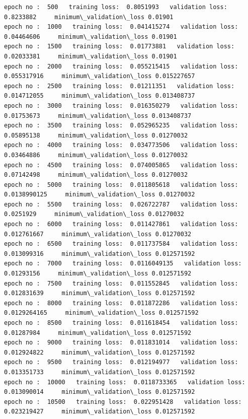 \documentclass[11pt, a4paper , landscape]{article}
\begin{document}
    \begin{Verbatim}[commandchars=\\\{\}]
epoch no :  500   training loss:  0.8051993   validation loss:  0.8233882     minimum\_validation\_loss 0.01901
epoch no :  1000   training loss:  0.041415274   validation loss:  0.04464606     minimum\_validation\_loss 0.01901
epoch no :  1500   training loss:  0.01773881   validation loss:  0.02033381     minimum\_validation\_loss 0.01901
epoch no :  2000   training loss:  0.055215415   validation loss:  0.055317916     minimum\_validation\_loss 0.015227657
epoch no :  2500   training loss:  0.01211351   validation loss:  0.014712055     minimum\_validation\_loss 0.013408737
epoch no :  3000   training loss:  0.016350279   validation loss:  0.01753673     minimum\_validation\_loss 0.013408737
epoch no :  3500   training loss:  0.052965235   validation loss:  0.05895138     minimum\_validation\_loss 0.01270032
epoch no :  4000   training loss:  0.034773506   validation loss:  0.03464886     minimum\_validation\_loss 0.01270032
epoch no :  4500   training loss:  0.074005865   validation loss:  0.07142498     minimum\_validation\_loss 0.01270032
epoch no :  5000   training loss:  0.011805618   validation loss:  0.0138990125     minimum\_validation\_loss 0.01270032
epoch no :  5500   training loss:  0.026722787   validation loss:  0.0251929     minimum\_validation\_loss 0.01270032
epoch no :  6000   training loss:  0.011427861   validation loss:  0.012761667     minimum\_validation\_loss 0.01270032
epoch no :  6500   training loss:  0.011737584   validation loss:  0.013099316     minimum\_validation\_loss 0.012571592
epoch no :  7000   training loss:  0.0116049135   validation loss:  0.01293156     minimum\_validation\_loss 0.012571592
epoch no :  7500   training loss:  0.011552845   validation loss:  0.012831639     minimum\_validation\_loss 0.012571592
epoch no :  8000   training loss:  0.011872286   validation loss:  0.0129264165     minimum\_validation\_loss 0.012571592
epoch no :  8500   training loss:  0.011618454   validation loss:  0.01287984     minimum\_validation\_loss 0.012571592
epoch no :  9000   training loss:  0.011831014   validation loss:  0.012924822     minimum\_validation\_loss 0.012571592
epoch no :  9500   training loss:  0.012194977   validation loss:  0.013351733     minimum\_validation\_loss 0.012571592
epoch no :  10000   training loss:  0.0118733365   validation loss:  0.013090014     minimum\_validation\_loss 0.012571592
epoch no :  10500   training loss:  0.022951428   validation loss:  0.023219427     minimum\_validation\_loss 0.012571592

\end{Verbatim}
\end{document}
